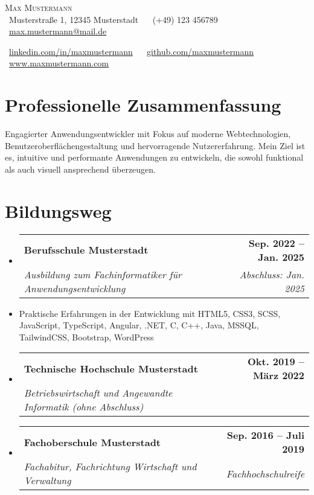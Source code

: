 \documentclass[letterpaper,11pt]{article}
\makeatletter
\newcommand{\resumeItem}[1]{
  \item\small{
    {#1 \vspace{0pt}}
  }
}
\newcommand{\resumeSubheading}[4]{
  \vspace{-2pt}\item
  \begin{tabular*}{1.0\textwidth}[t]{l@{\extracolsep{\fill}}r}
    \textbf{#1} & \textbf{\small #2} \\
    \textit{\small#3} & \textit{\small #4} \\
  \end{tabular*}\vspace{-7pt}
}
\newcommand{\resumeSubHeadingListStart}{\begin{itemize}[leftmargin=0.0in, label={}]}
\newcommand{\resumeSubHeadingListEnd}{\end{itemize}\vspace{0pt}}
\newcommand{\resumeItemListStart}{\begin{itemize}}
\newcommand{\resumeItemListEnd}{\end{itemize}\vspace{-5pt}}
\makeatother
\begin{document}
\begin{center}
  {\Large \scshape Max Mustermann} \\[2mm]
  \footnotesize
  \faMapPin \ Musterstraße 1, 12345 Musterstadt ~
  \faPhone\ (+49) 123 456789 ~ 
  \faEnvelope\ \href{mailto:max.mustermann@mail.de}{max.mustermann@mail.de}
\end{center}

\begin{center}
  \footnotesize
  \faLinkedin\ \underline{\href{https://www.linkedin.com/in/maxmustermann}{linkedin.com/in/maxmustermann}} ~
  \faGithub\ \underline{\href{https://github.com/maxmustermann}{github.com/maxmustermann}} ~
  \faGlobe\ \underline{\href{https://www.maxmustermann.com}{www.maxmustermann.com}}
\end{center}

\section{Professionelle Zusammenfassung}
Engagierter Anwendungsentwickler mit Fokus auf moderne Webtechnologien, Benutzeroberflächengestaltung und hervorragende Nutzererfahrung. Mein Ziel ist es, intuitive und performante Anwendungen zu entwickeln, die sowohl funktional als auch visuell ansprechend überzeugen.

\section{Bildungsweg}
\resumeSubHeadingListStart
  \resumeSubheading
    {Berufsschule Musterstadt}{Sep. 2022 – Jan. 2025}
    {Ausbildung zum Fachinformatiker für Anwendungsentwicklung}{Abschluss: Jan. 2025}
\resumeSubHeadingListEnd
\resumeItemListStart
  \resumeItem{Praktische Erfahrungen in der Entwicklung mit HTML5, CSS3, SCSS, JavaScript, TypeScript, Angular, .NET, C, C++, Java, MSSQL, TailwindCSS, Bootstrap, WordPress}
\resumeItemListEnd

\resumeSubHeadingListStart
  \resumeSubheading
    {Technische Hochschule Musterstadt}{Okt. 2019 – März 2022}
    {Betriebswirtschaft und Angewandte Informatik (ohne Abschluss)}{}
\resumeSubHeadingListEnd

\resumeSubHeadingListStart
  \resumeSubheading
    {Fachoberschule Musterstadt}{Sep. 2016 – Juli 2019}
    {Fachabitur, Fachrichtung Wirtschaft und Verwaltung}{Fachhochschulreife}
\resumeSubHeadingListEnd
\end{document}
